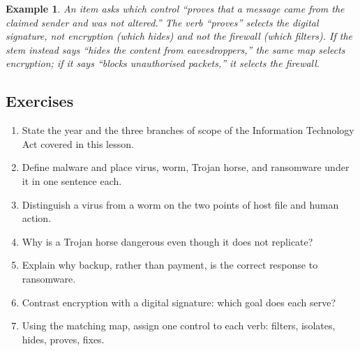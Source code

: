 \documentclass[11pt]{article}
\newtheorem{example}{Example}[section]
\begin{document}
\begin{example}
An item asks which control ``proves that a message came from the claimed
sender and was not altered.'' The verb ``proves'' selects the digital
signature, not encryption (which hides) and not the firewall (which
filters). If the stem instead says ``hides the content from
eavesdroppers,'' the same map selects encryption; if it says ``blocks
unauthorised packets,'' it selects the firewall.
\end{example}

\subsection*{Exercises}
\begin{enumerate}[label=\arabic*.]
  \item State the year and the three branches of scope of the Information
    Technology Act covered in this lesson.
  \item Define malware and place virus, worm, Trojan horse, and ransomware
    under it in one sentence each.
  \item Distinguish a virus from a worm on the two points of host file and
    human action.
  \item Why is a Trojan horse dangerous even though it does not replicate?
  \item Explain why backup, rather than payment, is the correct response to
    ransomware.
  \item Contrast encryption with a digital signature: which goal does each
    serve?
  \item Using the matching map, assign one control to each verb: filters,
    isolates, hides, proves, fixes.
\end{enumerate}
\end{document}
